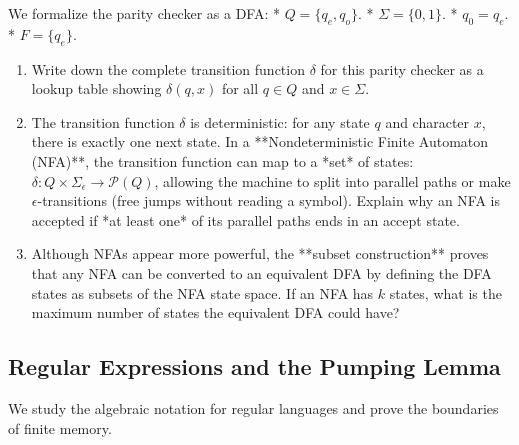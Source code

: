 \documentclass[12pt, a4paper]{book}
\begin{document}
\begin{explobox}
We formalize the parity checker as a DFA:
* $Q = \{q_e, q_o\}$.
* $\Sigma = \{0, 1\}$.
* $q_0 = q_e$.
* $F = \{q_e\}$.
\begin{enumerate}[label=(\alph*), leftmargin=*]
  \item Write down the complete transition function $\delta$ for this parity checker as a lookup table showing $\delta(q, x)$ for all $q \in Q$ and $x \in \Sigma$.
  \item The transition function $\delta$ is deterministic: for any state $q$ and character $x$, there is exactly one next state.
        In a **Nondeterministic Finite Automaton (NFA)**, the transition function can map to a *set* of states: $\delta: Q \times \Sigma_\epsilon \to \mathcal{P}(Q)$, allowing the machine to split into parallel paths or make $\epsilon$-transitions (free jumps without reading a symbol).
        Explain why an NFA is accepted if *at least one* of its parallel paths ends in an accept state.
  \item Although NFAs appear more powerful, the **subset construction** proves that any NFA can be converted to an equivalent DFA by defining the DFA states as subsets of the NFA state space.
        If an NFA has $k$ states, what is the maximum number of states the equivalent DFA could have?
\end{enumerate}
\end{explobox}

\subsection{Regular Expressions and the Pumping Lemma}

We study the algebraic notation for regular languages and prove the boundaries of finite memory.
\end{document}
